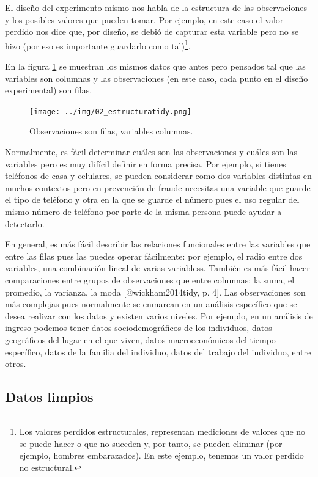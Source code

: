 \documentclass[]{article}
\let\rmarkdownfootnote\footnote%
\def\footnote{\protect\rmarkdownfootnote}
\begin{document}
El diseño del experimento mismo nos habla de la estructura de las
observaciones y los posibles valores que pueden tomar. Por ejemplo, en
este caso el valor perdido nos dice que, por diseño, se debió de
capturar esta variable pero no se hizo (por eso es importante guardarlo
como tal)\footnote{Los valores perdidos estructurales, representan
  mediciones de valores que no se puede hacer o que no suceden y, por
  tanto, se pueden eliminar (por ejemplo, hombres embarazados). En este
  ejemplo, tenemos un valor perdido no estructural.}.

En la figura \ref{fig:estructuratidy} se muestran los mismos datos que
antes pero pensados tal que las variables son columnas y las
observaciones (en este caso, cada punto en el diseño experimental) son
filas.

\begin{figure}[h]
    \centering
    \texttt{[image: ../img/02\_estructuratidy.png]}
    \caption{Observaciones son filas, variables columnas.}
    \label{fig:estructuratidy}
\end{figure}

Normalmente, es fácil determinar cuáles son las observaciones y cuáles
son las variables pero es muy difícil definir en forma precisa. Por
ejemplo, si tienes teléfonos de casa y celulares, se pueden considerar
como dos variables distintas en muchos contextos pero en prevención de
fraude necesitas una variable que guarde el tipo de teléfono y otra en
la que se guarde el número pues el uso regular del mismo número de
teléfono por parte de la misma persona puede ayudar a detectarlo.

En general, es más fácil describir las relaciones funcionales entre las
variables que entre las filas pues las puedes operar fácilmente: por
ejemplo, el radio entre dos variables, una combinación lineal de varias
variabless. También es más fácil hacer comparaciones entre grupos de
observaciones que entre columnas: la suma, el promedio, la varianza, la
moda {[}@wickham2014tidy, p. 4{]}. Las observaciones son más complejas
pues normalmente se enmarcan en un análisis específico que se desea
realizar con los datos y existen varios niveles. Por ejemplo, en un
análisis de ingreso podemos tener datos sociodemográficos de los
individuos, datos geográficos del lugar en el que viven, datos
macroeconómicos del tiempo específico, datos de la familia del
individuo, datos del trabajo del individuo, entre otros.

\subsection{Datos limpios}\label{datos-limpios}
\end{document}
